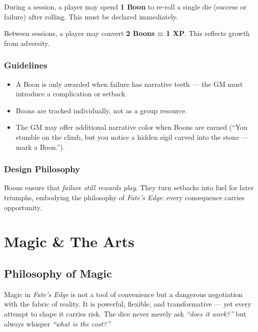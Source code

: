 \documentclass[12pt]{book}
\begin{document}
\begin{description}[leftmargin=2cm]
  \item[Re-roll Opportunity:] During a session, a player may spend \textbf{1 Boon} to re-roll a single die (success or failure) after rolling. This must be declared immediately.
  \item[Experience Conversion:] Between sessions, a player may convert \textbf{2 Boons = 1 XP}. This reflects growth from adversity.
\end{description}

\section*{Guidelines}
\begin{itemize}
  \item A Boon is only awarded when failure has narrative teeth — the GM must introduce a complication or setback.
  \item Boons are tracked individually, not as a group resource.
  \item The GM may offer additional narrative color when Boons are earned (“You stumble on the climb, but you notice a hidden sigil carved into the stone — mark a Boon.”).
\end{itemize}

\section*{Design Philosophy}
Boons ensure that \emph{failure still rewards play}. They turn setbacks into fuel for later triumphs, embodying the philosophy of \textit{Fate’s Edge}: every consequence carries opportunity.

\part{Magic \& The Arts}

\chapter{Philosophy of Magic}

Magic in \textit{Fate’s Edge} is not a tool of convenience but a dangerous negotiation with the fabric of reality.  
It is powerful, flexible, and transformative — yet every attempt to shape it carries risk. The dice never merely ask \emph{“does it work?”} but always whisper \emph{“what is the cost?”}
\end{document}
